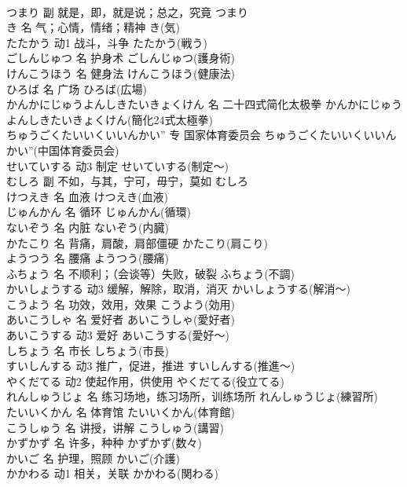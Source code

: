\documentclass[8pt]{extreport}
\begin{document}
\begin{CJK}{UTF8}{min}
\\	つまり	副	就是，即，就是说；总之，究竟	つまり	
\\	き	名	气；心情，情绪；精神	き(気)	
\\	たたかう	动1	战斗，斗争	たたかう(戦う)	
\\	ごしんじゅつ	名	护身术	ごしんじゅつ(護身術)	
\\	けんこうほう	名	健身法	けんこうほう(健康法)	
\\	ひろば	名	广场	ひろば(広場)	
\\	かんかにじゅうよんしきたいきょくけん	名	二十四式简化太极拳	かんかにじゅうよんしきたいきょくけん(簡化24式太極拳)	
\\	ちゅうごくたいいくいいんかい”	专	国家体育委员会	ちゅうごくたいいくいいんかい”(中国体育委员会)	
\\	せいていする	动3	制定	せいていする(制定～)	
\\	むしろ	副	不如，与其，宁可，毋宁，莫如	むしろ	
\\	けつえき	名	血液	けつえき(血液)	
\\	じゅんかん	名	循环	じゅんかん(循環)	
\\	ないぞう	名	内脏	ないぞう(内臓)	
\\	かたこり	名	背痛，肩酸，肩部僵硬	かたこり(肩こり)	
\\	ようつう	名	腰痛	ようつう(腰痛)	
\\	ふちょう	名	不顺利；（会谈等）失败，破裂	ふちょう(不調)	
\\	かいしょうする	动3	缓解，解除，取消，消灭	かいしょうする(解消～)	
\\	こうよう	名	功效，效用，效果	こうよう(効用)	
\\	あいこうしゃ	名	爱好者	あいこうしゃ(愛好者)	
\\	あいこうする	动3	爱好	あいこうする(愛好～)	
\\	しちょう	名	市长	しちょう(市長)	
\\	すいしんする	动3	推广，促进，推进	すいしんする(推進～)	
\\	やくだてる	动2	使起作用，供使用	やくだてる(役立てる)	
\\	れんしゅうじょ	名	练习场地，练习场所，训练场所	れんしゅうじょ(練習所)	
\\	たいいくかん	名	体育馆	たいいくかん(体育館)	
\\	こうしゅう	名	讲授，讲解	こうしゅう(講習)	
\\	かずかず	名	许多，种种	かずかず(数々)	
\\	かいご	名	护理，照顾	かいご(介護)	
\\	かかわる	动1	相关，关联	かかわる(関わる)	

\end{CJK}
\end{document}
